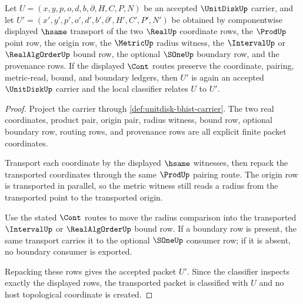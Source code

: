 \begin{theorem}
\label{thm:unitdisk-carrier-stability}
Let $U=(x,y,p,o,d,b,\partial,H,C,P,N)$ be an accepted $\UnitDiskUp$ carrier, and let $U'=(x',y',p',o',d',b',\partial',H',C',P',N')$ be obtained by componentwise displayed $\hsame$ transport of the two $\RealUp$ coordinate rows, the $\ProdUp$ point row, the origin row, the $\MetricUp$ radius witness, the $\IntervalUp$ or $\RealAlgOrderUp$ bound row, the optional $\SOneUp$ boundary row, and the provenance rows. If the displayed $\Cont$ routes preserve the coordinate, pairing, metric-read, bound, and boundary ledgers, then $U'$ is again an accepted $\UnitDiskUp$ carrier and the local classifier relates $U$ to $U'$.
\end{theorem}
\begin{proof}
Project the carrier through \autoref{def:unitdisk-bhist-carrier}. The two real coordinates, product pair, origin pair, radius witness, bound row, optional boundary row, routing rows, and provenance rows are all explicit finite packet coordinates.

Transport each coordinate by the displayed $\hsame$ witnesses, then repack the transported coordinates through the same $\ProdUp$ pairing route. The origin row is transported in parallel, so the metric witness still reads a radius from the transported point to the transported origin.

Use the stated $\Cont$ routes to move the radius comparison into the transported $\IntervalUp$ or $\RealAlgOrderUp$ bound row. If a boundary row is present, the same transport carries it to the optional $\SOneUp$ consumer row; if it is absent, no boundary consumer is exported.

Repacking these rows gives the accepted packet $U'$. Since the classifier inspects exactly the displayed rows, the transported packet is classified with $U$ and no host topological coordinate is created.
\end{proof}


